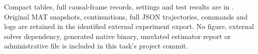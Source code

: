 \documentclass[11pt]{article}
\begin{document}
Compact tables, full causal-frame records, settings and test results are in
. Original MAT snapshots,
continuations, full JSON trajectories, commands and logs are retained in the
identified external experiment export. No figure, external solver dependency,
generated native binary, unrelated estimator report or administrative file is
included in this task's project commit.
\end{document}
